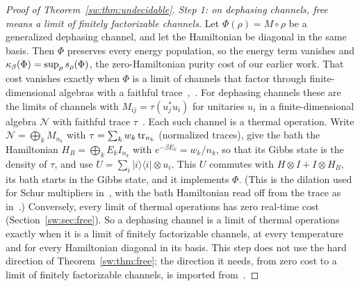 \begin{proof}[Proof of Theorem~\ref{sw:thm:undecidable}]
\emph{Step 1: on dephasing channels, free means a limit of finitely factorizable channels.} Let $\Phi(\rho)=M\circ\rho$ be a generalized dephasing channel, and let the Hamiltonian be diagonal in the same basis. Then $\Phi$ preserves every energy population, so the energy term vanishes and $\kappa_\beta(\Phi)=\sup_\rho s_\rho(\Phi)$, the zero-Hamiltonian purity cost of our earlier work. That cost vanishes exactly when $\Phi$ is a limit of channels that factor through finite-dimensional algebras with a faithful trace~\cite[Thm.~3.2(a)]{Memory},~\cite{Douglas26closed}. For dephasing channels these are the limits of channels with $M_{ij}=\tau(u_j^*u_i)$ for unitaries $u_i$ in a finite-dimensional algebra $\mathcal N$ with faithful trace $\tau$~\cite{HaagerupMusat11,Musat25}. Each such channel is a thermal operation. Write $\mathcal N=\bigoplus_k M_{n_k}$ with $\tau=\sum_kw_k\operatorname{tr}_{n_k}$ (normalized traces), give the bath the Hamiltonian $H_B=\bigoplus_kE_kI_{n_k}$ with $e^{-\beta E_k}=w_k/n_k$, so that its Gibbs state is the density of $\tau$, and use $U=\sum_i|i\rangle\langle i|\otimes u_i$. This $U$ commutes with $H\otimes I+I\otimes H_B$, its bath starts in the Gibbs state, and it implements $\Phi$. (This is the dilation used for Schur multipliers in~\cite{HaagerupMusat11,LieEtAl26}, with the bath Hamiltonian read off from the trace as in~\cite{LieEtAl26}.) Conversely, every limit of thermal operations has zero real-time cost (Section~\ref{sw:sec:free}). So a dephasing channel is a limit of thermal operations exactly when it is a limit of finitely factorizable channels, at every temperature and for every Hamiltonian diagonal in its basis. This step does not use the hard direction of Theorem~\ref{sw:thm:free}; the direction it needs, from zero cost to a limit of finitely factorizable channels, is imported from~\cite[Thm.~3.2(a)]{Memory}.


\end{proof}
